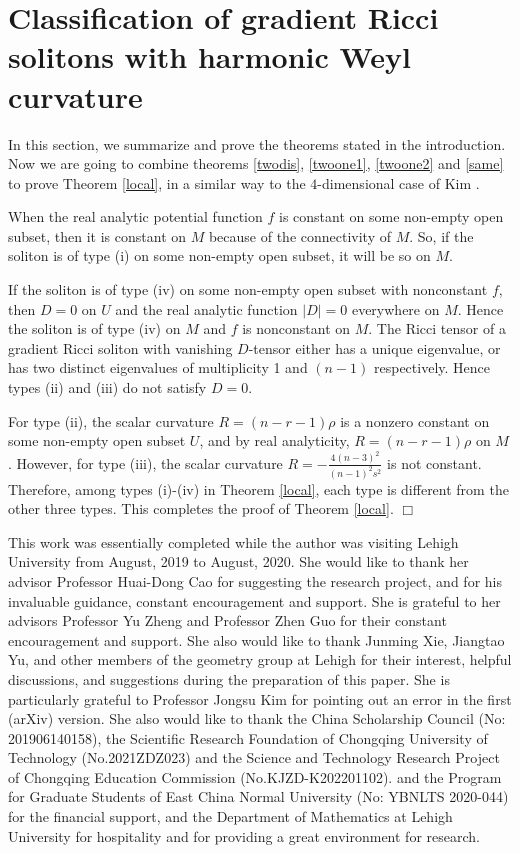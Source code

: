 \documentclass{amsart}
\theoremstyle{definition}
\theoremstyle{remark}
\numberwithin{equation}{section}
\begin{document}
	\section{Classification of gradient Ricci solitons with harmonic Weyl curvature}
	In this section, we summarize and prove the theorems stated in the introduction.
Now we are going to combine theorems \ref{twodis}, 
\ref{twoone1}, \ref{twoone2} and \ref{same} to prove Theorem \ref{local}, 
in a similar way to the $4$-dimensional case of Kim \cite{Kim}.

\medskip
{} 
When the real analytic potential function $f$ is constant on some non-empty open subset, 
then it is constant on $M$ because of the connectivity of $M$.
So, if the soliton is of type {\rm (i)} on some non-empty open subset, it will be so on $M$.

If the soliton is of type {\rm (iv)} on some non-empty open subset with nonconstant $f$, 
then $D=0$ on $U$ and the real analytic function $\left| D \right| =0$ everywhere on $M$. 
Hence the soliton is of type {\rm (iv)} on $M$ and $f$ is nonconstant on $M$. 
The Ricci tensor of a gradient Ricci soliton with vanishing $D$-tensor 
either has a unique eigenvalue, or has two distinct eigenvalues of 
multiplicity 1 and $(n-1)$ respectively. 
Hence types {\rm (ii)} and {\rm (iii)} do not satisfy $D=0$.

For type {\rm (ii)}, the scalar curvature $R=(n-r-1)\rho$ is a nonzero constant on some non-empty open subset $U$,
and by real analyticity, $R=(n-r-1)\rho$ on $M$.
However, for type {\rm (iii)}, the scalar curvature 
$R= -\frac{4(n-3)^2}{(n-1)^2s^2}$ is not constant.
Therefore, among types {\rm (i)}-{\rm (iv)} in Theorem \ref{local}, each type is different from the other three types.
This completes the proof of Theorem \ref{local}.
\hfill $\Box$
\medskip


\vspace{0.3cm}

\medskip
	This work was essentially completed while the author was visiting Lehigh University from August, 2019 to August, 2020. 
	She would like to thank her advisor Professor Huai-Dong Cao  
	for suggesting the research project, and for his invaluable guidance, constant encouragement and support.
	She is grateful to her advisors Professor Yu Zheng and Professor Zhen Guo for their constant encouragement and support.
	She also would like to thank Junming Xie, Jiangtao Yu, and other members of the geometry group at Lehigh for their interest, 
    helpful discussions, and suggestions during the preparation of this paper. 
    She is particularly grateful to Professor Jongsu Kim for pointing out an error in the first (arXiv) version.
    She also would like to thank the China Scholarship Council (No: 201906140158), the Scientific Research Foundation of Chongqing University of Technology
    (No.2021ZDZ023) and the Science and Technology Research Project of Chongqing Education Commission
    (No.KJZD-K202201102).
    and the Program for Graduate Students of East China Normal University (No: YBNLTS 2020-044)
    for the financial support, and the Department of Mathematics at Lehigh University
    for hospitality and for providing a great environment for research. 
\end{document}

